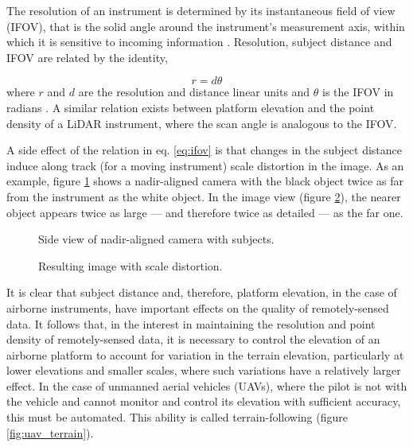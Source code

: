 \documentclass[10pt,a4paper]{report}
\begin{document}
The resolution of an instrument is determined by its instantaneous field of view (IFOV), that is the solid angle around the instrument's measurement axis, within which it is sensitive to incoming information \cite{Lillesand1999}. Resolution, subject distance and IFOV are related by the identity, 

\begin{equation}
r = d \theta
\label{eq:ifov}
\end{equation} 
where $r$ and $d$ are the resolution and distance linear units and $\theta$ is the IFOV in radians \cite{Lillesand1999}. A similar relation exists between platform elevation and the point density of a LiDAR instrument, where the scan angle is analogous to the IFOV. 

A side effect of the relation in eq. \ref{eq:ifov} is that changes in the subject distance induce along track (for a moving instrument) scale distortion in the image. As an example, figure \ref{fig:scale_cam} shows a nadir-aligned camera with the black object twice as far from the instrument as the white object. In the image view (figure \ref{fig:scale_img}), the nearer object appears twice as large --- and therefore twice as detailed --- as the far one. 

\begin{figure}
\centering
\def\svgscale{0.5}

\caption{Side view of nadir-aligned camera with subjects.}
\label{fig:scale_cam}
\end{figure}

\begin{figure}
\centering
\def\svgscale{0.5}

\caption{Resulting image with scale distortion.}
\label{fig:scale_img}
\end{figure}

It is clear that subject distance and, therefore, platform elevation, in the case of airborne instruments, have important effects on the quality of remotely-sensed data. It follows that, in the interest in maintaining the resolution and point density of remotely-sensed data, it is necessary to control the elevation of an airborne platform to account for variation in the terrain elevation, particularly at lower elevations and smaller scales, where such variations have a relatively larger effect. In the case of unmanned aerial vehicles (UAVs), where the pilot is not with the vehicle and cannot monitor and control its elevation with sufficient accuracy, this must be automated. This ability is called terrain-following (figure \ref{fig:uav_terrain}).
\end{document}
